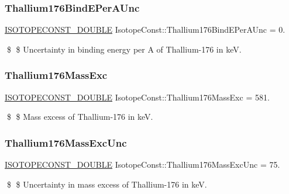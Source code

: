 \subsubsection{\texorpdfstring{Thallium176\+Bind\+E\+Per\+A\+Unc}{Thallium176BindEPerAUnc}}
{\footnotesize\ttfamily \mbox{\hyperlink{group___isotope_const-_macros_ga8f45a7272ce02c0b4c65c44636ed719a}{I\+S\+O\+T\+O\+P\+E\+C\+O\+N\+S\+T\+\_\+\+D\+O\+U\+B\+LE}} Isotope\+Const\+::\+Thallium176\+Bind\+E\+Per\+A\+Unc = 0.}

\$ \$ Uncertainty in binding energy per A of Thallium-\/176 in keV. \mbox{\label{group___isotope_const-_thallium-_tl176_ga4804e641c7febd15b93614d60263d924}} 
\subsubsection{\texorpdfstring{Thallium176\+Mass\+Exc}{Thallium176MassExc}}
{\footnotesize\ttfamily \mbox{\hyperlink{group___isotope_const-_macros_ga8f45a7272ce02c0b4c65c44636ed719a}{I\+S\+O\+T\+O\+P\+E\+C\+O\+N\+S\+T\+\_\+\+D\+O\+U\+B\+LE}} Isotope\+Const\+::\+Thallium176\+Mass\+Exc = 581.}

\$ \$ Mass excess of Thallium-\/176 in keV. \mbox{\label{group___isotope_const-_thallium-_tl176_ga682dc896d7171f7962586d6b4935e98e}} 
\subsubsection{\texorpdfstring{Thallium176\+Mass\+Exc\+Unc}{Thallium176MassExcUnc}}
{\footnotesize\ttfamily \mbox{\hyperlink{group___isotope_const-_macros_ga8f45a7272ce02c0b4c65c44636ed719a}{I\+S\+O\+T\+O\+P\+E\+C\+O\+N\+S\+T\+\_\+\+D\+O\+U\+B\+LE}} Isotope\+Const\+::\+Thallium176\+Mass\+Exc\+Unc = 75.}

\$ \$ Uncertainty in mass excess of Thallium-\/176 in keV. \mbox{\label{group___isotope_const-_thallium-_tl176_ga3b9e472bbb8b78522f62d1aafe2b5e07}} 
